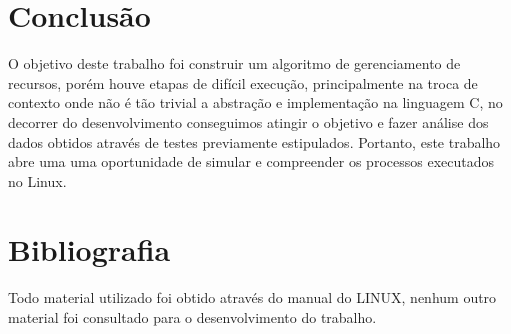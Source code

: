 \documentclass[a4paper, 12pt]{article}
\begin{document}
\section{Conclusão}
O objetivo deste trabalho foi construir um algoritmo de gerenciamento de recursos, porém houve etapas de difícil execução, principalmente na troca de contexto onde não é tão trivial a abstração e implementação na linguagem C, no decorrer do desenvolvimento conseguimos atingir o objetivo e fazer análise dos dados obtidos através de testes previamente estipulados. Portanto, este trabalho abre uma uma oportunidade de simular e compreender os processos executados no Linux.
\newpage
\section{Bibliografia}
\footnotesize{
Todo material utilizado foi obtido através do manual do LINUX, nenhum outro material foi consultado para o desenvolvimento do trabalho.

}
\end{document}
